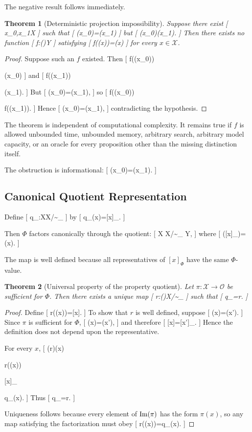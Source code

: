 \documentclass[11pt]{article}
\newtheorem{theorem}{Theorem} \newtheorem{proposition}{Proposition} \newtheorem{lemma}{Lemma} \newtheorem{corollary}{Corollary} \newtheorem{definition}{Definition} \newtheorem{remark}{Remark}
\begin{document}
The negative result follows immediately.

\begin{theorem}[Deterministic projection impossibility]
Suppose there exist
[
x_0,x_1\in\mathcal X
]
such that
[
\pi(x_0)=\pi(x_1)
]
but
[
\Phi(x_0)\neq\Phi(x_1).
]
Then there exists no function
[
f:\Img(\pi)\to\mathcal Y
]
satisfying
[
f(\pi(x))=\Phi(x)
]
for every $x\in\mathcal X$.
\end{theorem}

\begin{proof}
Suppose such an $f$ existed. Then
[
f(\pi(x_0))

\Phi(x_0)
]
and
[
f(\pi(x_1))

\Phi(x_1).
]
But
[
\pi(x_0)=\pi(x_1),
]
so
[
f(\pi(x_0))

f(\pi(x_1)).
]
Hence
[
\Phi(x_0)=\Phi(x_1),
]
contradicting the hypothesis.
\end{proof}

The theorem is independent of computational complexity. It remains true if $f$ is allowed unbounded time, unbounded memory, arbitrary search, arbitrary model capacity, or an oracle for every proposition other than the missing distinction itself.

The obstruction is informational:
[
\pi(x_0)=\pi(x_1).
]

\subsection{Canonical Quotient Representation}

Define
[
q_\Phi:\mathcal X\to\mathcal X/{\sim_\Phi}
]
by
[
q_\Phi(x)=[x]_\Phi.
]

Then $\Phi$ factors canonically through the quotient:
[
\mathcal X
\mathcal X/{\sim_\Phi}
\xrightarrow{\widetilde{\Phi}}
\mathcal Y,
]
where
[
\widetilde{\Phi}([x]_\Phi)=\Phi(x).
]

The map is well defined because all representatives of $[x]_\Phi$ have the same $\Phi$-value.

\begin{theorem}[Universal property of the property quotient]
Let $\pi:\mathcal X\to\mathcal O$ be sufficient for $\Phi$. Then there exists a unique map
[
r:\Img(\pi)\to\mathcal X/{\sim_\Phi}
]
such that
[
q_\Phi=r\circ\pi.
]
\end{theorem}

\begin{proof}
Define
[
r(\pi(x))=[x]\Phi.
]
To show that $r$ is well defined, suppose
[
\pi(x)=\pi(x').
]
Since $\pi$ is sufficient for $\Phi$,
[
\Phi(x)=\Phi(x'),
]
and therefore
[
[x]\Phi=[x']_\Phi.
]
Hence the definition does not depend upon the representative.

For every $x$,
[
(r\circ\pi)(x)

r(\pi(x))

[x]_\Phi

q_\Phi(x).
]
Thus
[
q_\Phi=r\circ\pi.
]

Uniqueness follows because every element of $\operatorname{Im}(\pi)$ has the form $\pi(x)$, so any map satisfying the factorization must obey
[
r(\pi(x))=q_\Phi(x).
]
\end{proof}
\end{document}
